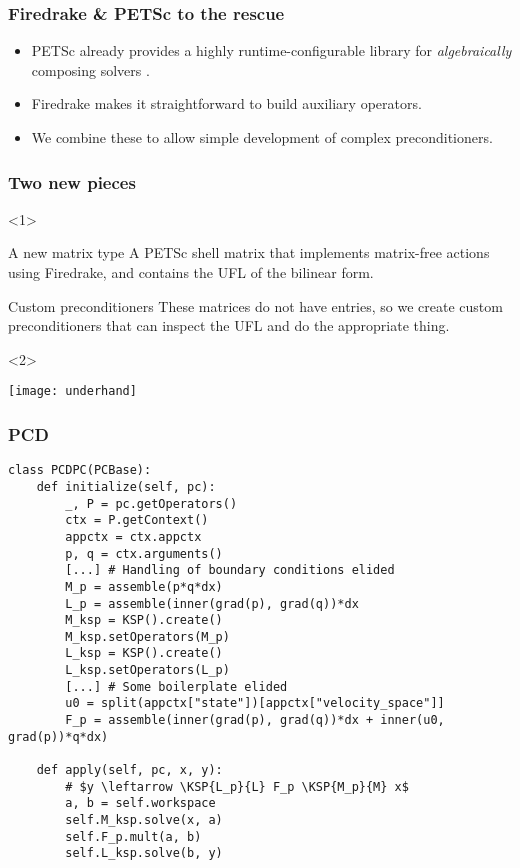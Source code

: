 \documentclass[presentation]{beamer}
\newcommand{\KSP}[2]{\ensuremath{\mathcal{K}\left(#1, \mathbb{#2}\right)}}
\begin{document}
\begin{frame}
  \frametitle{Firedrake \& PETSc to the rescue}
  \begin{itemize}
  \item PETSc already provides a highly runtime-configurable library
    for \emph{algebraically} composing solvers \parencite{Brown:2012}.

  \item Firedrake makes it straightforward to build auxiliary
    operators.

  \item We combine these to allow simple development of complex
    preconditioners.
  \end{itemize}
\end{frame}
\begin{frame}
  \frametitle{Two new pieces}
 
  \begin{onlyenv}<1>
    \begin{block}{A new matrix type}
      A PETSc shell matrix that implements matrix-free actions using
      Firedrake, and contains the UFL of the bilinear form.
    \end{block}
  
  \begin{block}{Custom preconditioners}
    These matrices do not have entries, so we create custom
    preconditioners that can inspect the UFL and do the appropriate
    thing.
  \end{block}
\end{onlyenv}
\begin{onlyenv}<2>
  \begin{center}
    \texttt{[image: underhand]}
  \end{center}
\end{onlyenv}
\end{frame}


\begin{frame}[fragile]
  \frametitle{PCD}

\begin{verbatim}
class PCDPC(PCBase):
    def initialize(self, pc):
        _, P = pc.getOperators()
        ctx = P.getContext()
        appctx = ctx.appctx
        p, q = ctx.arguments()
        [...] # Handling of boundary conditions elided
        M_p = assemble(p*q*dx)
        L_p = assemble(inner(grad(p), grad(q))*dx
        M_ksp = KSP().create()
        M_ksp.setOperators(M_p)
        L_ksp = KSP().create()
        L_ksp.setOperators(L_p)
        [...] # Some boilerplate elided
        u0 = split(appctx["state"])[appctx["velocity_space"]]
        F_p = assemble(inner(grad(p), grad(q))*dx + inner(u0, grad(p))*q*dx)

    def apply(self, pc, x, y):
        # $y \leftarrow \KSP{L_p}{L} F_p \KSP{M_p}{M} x$
        a, b = self.workspace
        self.M_ksp.solve(x, a)
        self.F_p.mult(a, b)
        self.L_ksp.solve(b, y)
\end{verbatim}
\end{frame}
\end{document}
